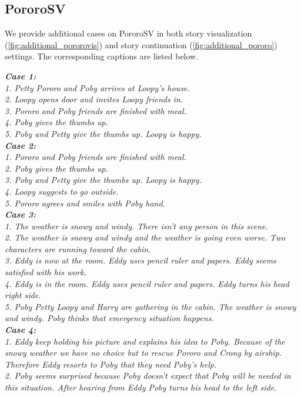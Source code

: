\documentclass[10pt,twocolumn,letterpaper]{article}
\begin{document}
\subsection{PororoSV}
\label{sec:additional_pororo}
We provide additional cases on PororoSV in both story visualization (\cref{fig:additional_pororovis}) and story continuation (\cref{fig:additional_pororo}) settings. The corresponding captions are listed below.

\textit{\footnotesize{\textbf{Case 1:}\\
1. Petty Pororo and Poby arrives at Loopy's house.\\
2. Loopy opens door and invites Loopy friends in.\\
3. Pororo and Poby friends are finished with meal.\\
4. Poby gives the thumbs up.\\
5. Poby and Petty give the thumbs up. Loopy is happy.\\
\textbf{Case 2:}\\
1. Pororo and Poby friends are finished with meal.\\
2. Poby gives the thumbs up.\\
3. Poby and Petty give the thumbs up. Loopy is happy.\\
4. Loopy suggests to go outside.\\
5. Pororo agrees and smiles with Poby hand.\\
\textbf{Case 3:}\\
1. The weather is snowy and windy. There isn't any person in this scene.\\
2. The weather is snowy and windy and the weather is going even worse. Two characters are running toward the cabin.\\
3. Eddy is now at the room. Eddy uses pencil ruler and papers. Eddy seems satisfied with his work.\\
4. Eddy is in the room. Eddy uses pencil ruler and papers. Eddy turns his head right side.\\
5. Poby Petty Loopy and Harry are gathering in the cabin. The weather is snowy and windy. Poby thinks that emergency situation happens.\\
\textbf{Case 4:}\\
1. Eddy keep holding his picture and explains his idea to Poby. Because of the snowy weather we have no choice but to rescue Pororo and Crong by airship. Therefore Eddy resorts to Poby that they need Poby's help.\\
2. Poby seems surprised because Poby doesn't expect that Poby will be needed in this situation. After hearing from Eddy Poby turns his head to the left side.\\
}}
\end{document}
